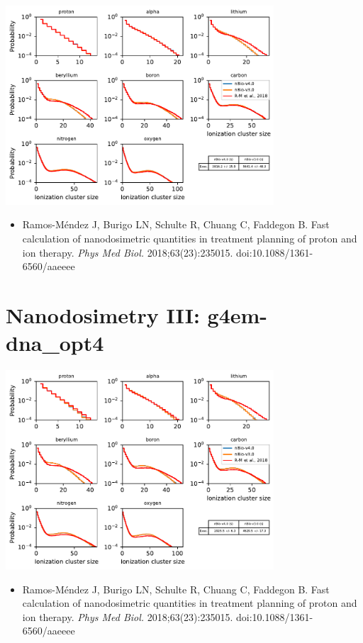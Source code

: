 \documentclass[aspectratio=1610]{beamer}
\begin{document}
\begin{frame}{\secname}
 \centering
   \includegraphics[width=0.75\textwidth]{./NanodosimetryIII/nanoIII_opt2}
\begin{itemize}
 \item \tiny{Ramos-M\'endez J, Burigo LN, Schulte R, Chuang C, Faddegon B. Fast calculation of nanodosimetric quantities in treatment planning of proton and ion therapy. \textit{Phys Med Biol.} 2018;63(23):235015. doi:10.1088/1361-6560/aaeeee}
\end{itemize}
\end{frame}

\section{Nanodosimetry III: g4em-dna\_opt4}

\begin{frame}{\secname}
 \centering
   \includegraphics[width=0.75\textwidth]{./NanodosimetryIII/nanoIII_opt4}
\begin{itemize}
 \item \tiny{Ramos-M\'endez J, Burigo LN, Schulte R, Chuang C, Faddegon B. Fast calculation of nanodosimetric quantities in treatment planning of proton and ion therapy. \textit{Phys Med Biol.} 2018;63(23):235015. doi:10.1088/1361-6560/aaeeee}
\end{itemize}
\end{frame}
\end{document}
